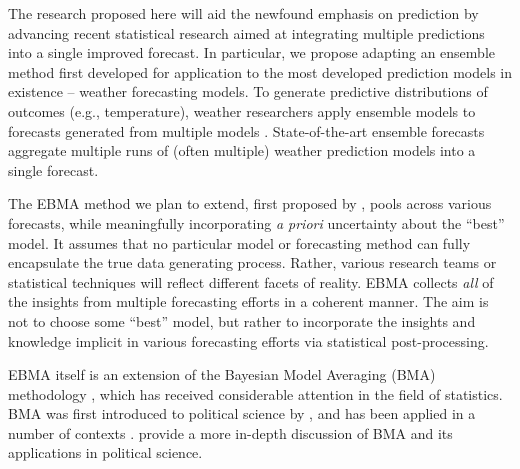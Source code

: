 \documentclass[pdftex,12pt,fullpage,oneside]{amsart}
\begin{document}
The research proposed here will aid the newfound emphasis on
prediction by advancing recent statistical research aimed at
integrating multiple predictions into a single improved forecast.  In
particular, we propose adapting an ensemble method first developed for
application to the most developed prediction models in existence --
weather forecasting models.  To generate predictive distributions of
outcomes (e.g., temperature), weather researchers apply ensemble
models to forecasts generated from multiple models
\citep{Raftery:2005}.  State-of-the-art ensemble forecasts aggregate
multiple runs of (often multiple) weather prediction models into a
single forecast.

The EBMA method we plan to extend, first proposed by
\citet{Raftery:2005}, pools across various forecasts, while
meaningfully incorporating \textit{a priori} uncertainty about the
``best'' model.  It assumes that no particular model or forecasting
method can fully encapsulate the true data generating process.
Rather, various research teams or statistical techniques will reflect
different facets of reality. EBMA collects \textit{all} of the
insights from multiple forecasting efforts in a coherent manner.  The
aim is not to choose some ``best'' model, but rather to incorporate
the insights and knowledge implicit in various forecasting efforts via
statistical post-processing.

EBMA itself is an extension of the Bayesian Model Averaging (BMA)
methodology \citep[c.f.,][]{Madigan:1994, Draper:1995, Raftery:1995,
  Hoeting:1999, Clyde:2003, Raftery:2003, Clyde:2004}, which has
received considerable attention in the field of statistics. BMA was
first introduced to political science by \citet{Bartels:1997}, and has
been applied in a number of contexts \citep[e.g.,][]{Bartels:2001,
  Gill:2004, Imai:2004, Geer:2006b}. \citet{Montgomery:2010c} provide
a more in-depth discussion of BMA and its applications in political
science.
\end{document}
